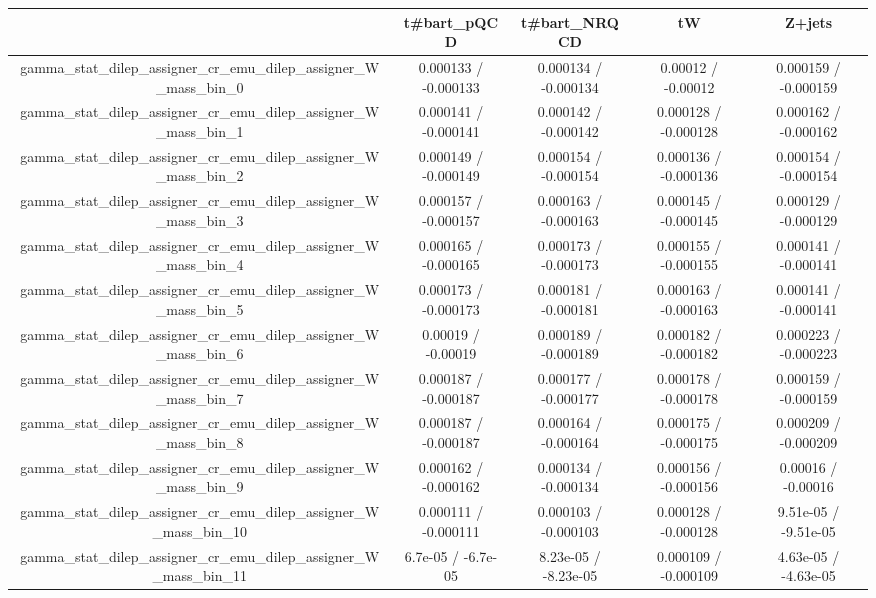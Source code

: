 \documentclass[10pt]{article}
\begin{document}
\begin{table}[htbp]
\begin{center}
\begin{tabular}{|c|c|c|c|c|}
\hline 
      & t#bar{t}_{pQCD}      & t#bar{t}_{NRQCD}      & tW      & Z+jets \\ 
\hline 
  gamma_stat_dilep_assigner_cr_emu_dilep_assigner_W_mass_bin_0 & 0.000133 / -0.000133 & 0.000134 / -0.000134 & 0.00012 / -0.00012 & 0.000159 / -0.000159 \\ 
  gamma_stat_dilep_assigner_cr_emu_dilep_assigner_W_mass_bin_1 & 0.000141 / -0.000141 & 0.000142 / -0.000142 & 0.000128 / -0.000128 & 0.000162 / -0.000162 \\ 
  gamma_stat_dilep_assigner_cr_emu_dilep_assigner_W_mass_bin_2 & 0.000149 / -0.000149 & 0.000154 / -0.000154 & 0.000136 / -0.000136 & 0.000154 / -0.000154 \\ 
  gamma_stat_dilep_assigner_cr_emu_dilep_assigner_W_mass_bin_3 & 0.000157 / -0.000157 & 0.000163 / -0.000163 & 0.000145 / -0.000145 & 0.000129 / -0.000129 \\ 
  gamma_stat_dilep_assigner_cr_emu_dilep_assigner_W_mass_bin_4 & 0.000165 / -0.000165 & 0.000173 / -0.000173 & 0.000155 / -0.000155 & 0.000141 / -0.000141 \\ 
  gamma_stat_dilep_assigner_cr_emu_dilep_assigner_W_mass_bin_5 & 0.000173 / -0.000173 & 0.000181 / -0.000181 & 0.000163 / -0.000163 & 0.000141 / -0.000141 \\ 
  gamma_stat_dilep_assigner_cr_emu_dilep_assigner_W_mass_bin_6 & 0.00019 / -0.00019 & 0.000189 / -0.000189 & 0.000182 / -0.000182 & 0.000223 / -0.000223 \\ 
  gamma_stat_dilep_assigner_cr_emu_dilep_assigner_W_mass_bin_7 & 0.000187 / -0.000187 & 0.000177 / -0.000177 & 0.000178 / -0.000178 & 0.000159 / -0.000159 \\ 
  gamma_stat_dilep_assigner_cr_emu_dilep_assigner_W_mass_bin_8 & 0.000187 / -0.000187 & 0.000164 / -0.000164 & 0.000175 / -0.000175 & 0.000209 / -0.000209 \\ 
  gamma_stat_dilep_assigner_cr_emu_dilep_assigner_W_mass_bin_9 & 0.000162 / -0.000162 & 0.000134 / -0.000134 & 0.000156 / -0.000156 & 0.00016 / -0.00016 \\ 
  gamma_stat_dilep_assigner_cr_emu_dilep_assigner_W_mass_bin_10 & 0.000111 / -0.000111 & 0.000103 / -0.000103 & 0.000128 / -0.000128 & 9.51e-05 / -9.51e-05 \\ 
  gamma_stat_dilep_assigner_cr_emu_dilep_assigner_W_mass_bin_11 & 6.7e-05 / -6.7e-05 & 8.23e-05 / -8.23e-05 & 0.000109 / -0.000109 & 4.63e-05 / -4.63e-05 \\ 

\end{tabular}
\end{center}
\end{table}
\end{document}
